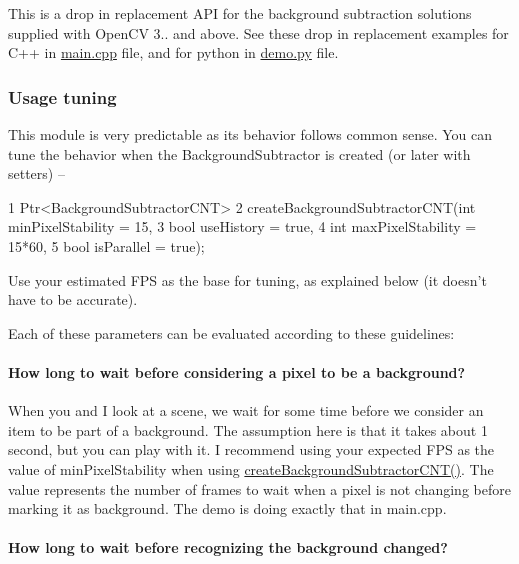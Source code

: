 This is a drop in replacement A\+PI for the background subtraction solutions supplied with Open\+CV 3.. and above. See these drop in replacement examples for C++ in \hyperlink{main_8cpp-example}{main.cpp} file, and for python in \hyperlink{python_2demo_8py-example}{demo.py} file.

\subsubsection*{Usage tuning}

This module is very predictable as it\textquotesingle{}s behavior follows common sense. You can tune the behavior when the Background\+Subtractor is created (or later with setters) –


\begin{DoxyCode}
1 Ptr<BackgroundSubtractorCNT>
2 createBackgroundSubtractorCNT(int minPixelStability = 15,
3                               bool useHistory = true,
4                               int maxPixelStability = 15*60,
5                               bool isParallel = true);
\end{DoxyCode}

\begin{DoxyItemize}
\item Use your estimated F\+PS as the base for tuning, as explained below (it doesn’t have to be accurate).
\item Each of these parameters can be evaluated according to these guidelines\+:
\end{DoxyItemize}

\paragraph*{How long to wait before considering a pixel to be a background?}

When you and I look at a scene, we wait for some time before we consider an item to be part of a background. The assumption here is that it takes about 1 second, but you can play with it. I recommend using your expected F\+PS as the value of min\+Pixel\+Stability when using \hyperlink{namespacecv_1_1bgsubcnt_a6a6efd913954320be33f39c32a4c5a7e}{create\+Background\+Subtractor\+C\+N\+T()}. The value represents the number of frames to wait when a pixel is not changing before marking it as background. The demo is doing exactly that in main.\+cpp.

\paragraph*{How long to wait before recognizing the background changed?}


